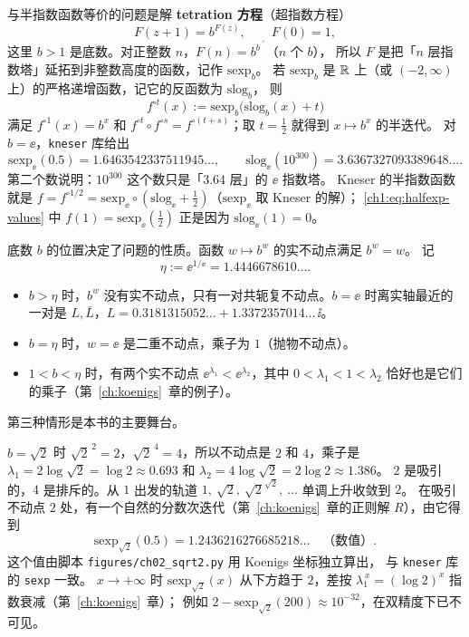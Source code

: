 与半指数函数等价的问题是解 \textbf{tetration 方程}（超指数方程）
\begin{equation}\label{ch1:eq:tetration}
  F(z+1)=b^{F(z)},\qquad F(0)=1 ,
\end{equation}
这里 $b>1$ 是底数。对正整数 $n$，$F(n)=b^{b^{\cdot^{\cdot^{b}}}}$（$n$ 个 $b$），
所以 $F$ 是把「$n$ 层指数塔」延拓到非整数高度的函数，记作 $\mathrm{sexp}_b$。
若 $\mathrm{sexp}_b$ 是 $\mathbb{R}$ 上（或 $(-2,\infty)$ 上）的严格递增函数，记它的反函数为 $\mathrm{slog}_b$，
则
\[
  f^{\circ t}(x):=\mathrm{sexp}_b\bigl(\mathrm{slog}_b(x)+t\bigr)
\]
满足 $f^{\circ 1}(x)=b^x$ 和 $f^{\circ t}\circ f^{\circ s}=f^{\circ(t+s)}$；取 $t=\frac12$ 就得到 $x\mapsto b^x$ 的半迭代。
对 $b=\ee$，\texttt{kneser} 库给出
\[
  \mathrm{sexp}_\ee(0.5)=1.6463542337511945\ldots,\qquad
  \mathrm{slog}_\ee(10^{300})=3.6367327093389648\ldots .
\]
第二个数说明：$10^{300}$ 这个数只是「3.64 层」的 $\ee$ 指数塔。
Kneser 的半指数函数就是 $f=f^{\circ1/2}=\mathrm{sexp}_\ee\circ(\mathrm{slog}_\ee+\tfrac12)$（$\mathrm{sexp}_\ee$ 取 Kneser 的解）；
\eqref{ch1:eq:halfexp-values} 中 $f(1)=\mathrm{sexp}_\ee(\tfrac12)$ 正是因为 $\mathrm{slog}_\ee(1)=0$。

底数 $b$ 的位置决定了问题的性质。函数 $w\mapsto b^w$ 的实不动点满足 $b^w=w$。
记
\[
  \eta:=\ee^{1/\ee}=1.4446678610\ldots .
\]
\begin{itemize}
\item $b>\eta$ 时，$b^w$ 没有实不动点，只有一对共轭复不动点。$b=\ee$ 时离实轴最近的一对是 $L,\bar L$，$L=0.3181315052\ldots+1.3372357014\ldots\,\ii$。
\item $b=\eta$ 时，$w=\ee$ 是二重不动点，乘子为 $1$（抛物不动点）。
\item $1<b<\eta$ 时，有两个实不动点 $\ee^{\lambda_1}<\ee^{\lambda_2}$，其中 $0<\lambda_1<1<\lambda_2$ 恰好也是它们的乘子（第~\ref{ch:koenigs}~章的例子）。
\end{itemize}
第三种情形是本书的主要舞台。

\begin{example}[底数 $\sqrt2$]\label{ch1:ex:sqrt2}
$b=\sqrt2$ 时 $\sqrt2^{\,2}=2$，$\sqrt2^{\,4}=4$，所以不动点是 $2$ 和 $4$，乘子是
$\lambda_1=2\log\sqrt2=\log2\approx0.693$ 和 $\lambda_2=4\log\sqrt2=2\log2\approx1.386$。
$2$ 是吸引的，$4$ 是排斥的。从 $1$ 出发的轨道
$1,\ \sqrt2,\ \sqrt2^{\sqrt2},\ \dots$ 单调上升收敛到 $2$。
在吸引不动点 $2$ 处，有一个自然的分数次迭代（第~\ref{ch:koenigs}~章的正则解 $R$），由它得到
\[
  \mathrm{sexp}_{\sqrt2}(0.5)=1.2436216276685218\ldots\quad\text{（数值）}.
\]
这个值由脚本 \texttt{figures/ch02\_sqrt2.py} 用 Koenigs 坐标独立算出，
与 \texttt{kneser} 库的 \texttt{sexp} 一致。
$x\to+\infty$ 时 $\mathrm{sexp}_{\sqrt2}(x)$ 从下方趋于 $2$，差按 $\lambda_1^{\,x}=(\log2)^x$ 指数衰减（第~\ref{ch:koenigs}~章）；
例如 $2-\mathrm{sexp}_{\sqrt2}(200)\approx10^{-32}$，在双精度下已不可见。
\end{example}

